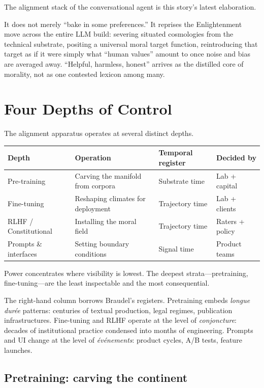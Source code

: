 The alignment stack of the conversational agent is this story's latest elaboration.

It does not merely ``bake in some preferences.'' It reprises the Enlightenment move across the entire LLM build: severing situated cosmologies from the technical substrate, positing a universal moral target function, reintroducing that target as if it were simply what ``human values'' amount to once noise and bias are averaged away. ``Helpful, harmless, honest'' arrives as the distilled core of morality, not as one contested lexicon among many.

\section{Four Depths of Control}

The alignment apparatus operates at several distinct depths.

\begin{formalbox}[title={Four Depths of Control}]
\begin{tabular}{p{2.5cm} p{3.5cm} p{3cm} p{2.5cm}}
\textbf{Depth} & \textbf{Operation} & \textbf{Temporal register} & \textbf{Decided by} \\
\hline
Pre-training & Carving the manifold from corpora & Substrate time & Lab + capital \\
Fine-tuning & Reshaping climates for deployment & Trajectory time & Lab + clients \\
RLHF / Constitutional & Installing the moral field & Trajectory time & Raters + policy \\
Prompts \& interfaces & Setting boundary conditions & Signal time & Product teams \\
\end{tabular}

Power concentrates where visibility is lowest. The deepest strata---pretraining, fine-tuning---are the least inspectable and the most consequential.
\end{formalbox}

The right-hand column borrows Braudel's registers. Pretraining embeds \emph{longue dur\'ee} patterns: centuries of textual production, legal regimes, publication infrastructures. Fine-tuning and RLHF operate at the level of \emph{conjoncture}: decades of institutional practice condensed into months of engineering. Prompts and UI change at the level of \emph{\'ev\'enements}: product cycles, A/B tests, feature launches.

\subsection{Pretraining: carving the continent}

